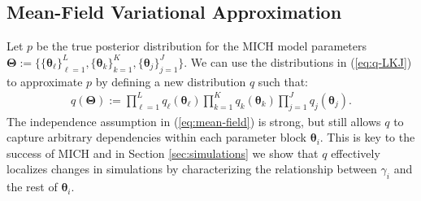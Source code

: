 \subsection{Mean-Field Variational Approximation}
\label{sec:variational-bayes}

Let $p$ be the true posterior distribution for the MICH model parameters $\boldsymbol{\Theta}:= \{\{\boldsymbol{\theta}_\ell\}_{\ell=1}^L, \{\boldsymbol{\theta}_k\}_{k=1}^K, \{\boldsymbol{\theta}_j\}_{j=1}^J\}$. We can use the distributions in (\ref{eq:q-LKJ}) to approximate $p$ by defining a new distribution $q$ such that:
\begin{align}\label{eq:mean-field}
    q(\boldsymbol{\Theta}) :=  \prod_{\ell=1}^L q_\ell(\boldsymbol{\theta}_\ell)\prod_{k=1}^K q_k(\boldsymbol{\theta}_k) \prod_{j=1}^J q_j(\boldsymbol{\theta}_j).
\end{align}
The independence assumption in (\ref{eq:mean-field}) is strong, but still allows $q$ to capture arbitrary dependencies within each parameter block $\boldsymbol{\theta}_i$. This is key to the success of MICH and in Section \ref{sec:simulations} we show that $q$ effectively localizes changes in simulations by characterizing the relationship between $\gamma_i$ and the rest of $\boldsymbol{\theta}_i$. 

